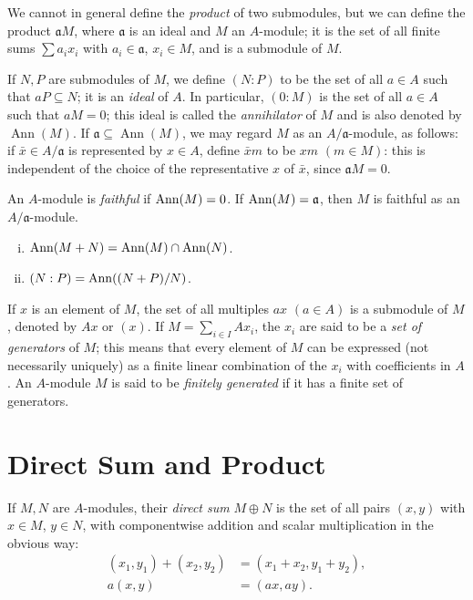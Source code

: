 We cannot in general define the \emph{product} of two submodules, but we can define the product $\mathfrak{a}M$, where $\mathfrak{a}$ is an ideal and $M$ an $A$-module; it is the set of all finite sums $\sum a_i x_i$ with $a_i \in \mathfrak{a}$, $x_i \in M$, and is a submodule of $M$.

If $N, P$ are submodules of $M$, we define $(N : P)$ to be the set of all $a \in A$ such that $aP \subseteq N$; it is an \emph{ideal} of $A$. In particular, $(0 : M)$ is the set of all $a \in A$ such that $aM = 0$; this ideal is called the \emph{annihilator} of $M$ and is also denoted by $\operatorname{Ann}(M)$. If $\mathfrak{a} \subseteq \operatorname{Ann}(M)$, we may regard $M$ as an $A/\mathfrak{a}$-module, as follows: if $\bar{x} \in A/\mathfrak{a}$ is represented by $x \in A$, define $\bar{x}m$ to be $xm$ $(m \in M)$: this is independent of the choice of the representative $x$ of $\bar{x}$, since $\mathfrak{a}M = 0$.

An $A$-module is \emph{faithful} if $\operatorname{Ann}(M) = 0$. If $\operatorname{Ann}(M) = \mathfrak{a}$, then $M$ is faithful as an $A/\mathfrak{a}$-module.

\begin{exercise}\label{ex:annihilator-properties}
\begin{enumerate}[i)]
    \item $\operatorname{Ann}(M + N) = \operatorname{Ann}(M) \cap \operatorname{Ann}(N)$.
    \item $(N:P) = \operatorname{Ann}((N + P)/N)$.
\end{enumerate}
\end{exercise}

If $x$ is an element of $M$, the set of all multiples $ax$ $(a \in A)$ is a submodule of $M$, denoted by $Ax$ or $(x)$. If $M = \sum_{i \in I} Ax_i$, the $x_i$ are said to be a \emph{set of generators} of $M$; this means that every element of $M$ can be expressed (not necessarily uniquely) as a finite linear combination of the $x_i$ with coefficients in $A$. An $A$-module $M$ is said to be \emph{finitely generated} if it has a finite set of generators.
\section*{Direct Sum and Product}

If $M, N$ are $A$-modules, their \emph{direct sum} $M \oplus N$ is the set of all pairs $(x, y)$ with $x \in M$, $y \in N$, with componentwise addition and scalar multiplication in the obvious way:
\begin{align*}
    (x_1, y_1) + (x_2, y_2) &= (x_1 + x_2, y_1 + y_2), \\
    a(x, y) &= (ax, ay).
\end{align*}

